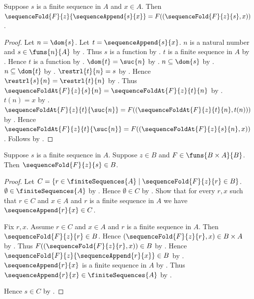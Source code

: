 \begin{theorem}\label{sequence_fold_append}
    Suppose $s$ is a finite sequence in $A$ and $x\in A$.
    Then
        $\sequenceFold{F}{z}{\sequenceAppend{s}{x}}
            =F((\sequenceFold{F}{z}{s},x))$.
\end{theorem}
\begin{proof}
    Let $n=\dom{s}$.
    Let $t=\sequenceAppend{s}{x}$.
    $n$ is a natural number and $s\in\funs{n}{A}$
        by .
    Thus $s$ is a function by .
    $t$ is a finite sequence in $A$
        by .
    Hence $t$ is a function by
        .
    $\dom{t}=\suc{n}$ by .
    $n\subseteq\dom{s}$ by .
    $n\subseteq\dom{t}$
        by .
    $\restrl{t}{n}=s$ by .
    Hence $\restrl{s}{n}=\restrl{t}{n}$
        by .
    Thus $\sequenceFoldAt{F}{z}{s}{n}
        =\sequenceFoldAt{F}{z}{t}{n}$
        by .
    $t(n)=x$ by .
    $\sequenceFoldAt{F}{z}{t}{\suc{n}}
        =F((\sequenceFoldAt{F}{z}{t}{n},t(n)))$
        by .
    Hence $\sequenceFoldAt{F}{z}{t}{\suc{n}}
        =F((\sequenceFoldAt{F}{z}{s}{n},x))$.
    Follows by .
\end{proof}

\begin{theorem}\label{sequence_fold_typed}
    Suppose $s$ is a finite sequence in $A$.
    Suppose $z\in B$ and $F\in\funs{B\times A}{B}$.
    Then $\sequenceFold{F}{z}{s}\in B$.
\end{theorem}
\begin{proof}
    Let $C=\{r\in\finiteSequences{A}\mid
        \sequenceFold{F}{z}{r}\in B\}$.
    $\emptyset\in\finiteSequences{A}$
        by .
    Hence $\emptyset\in C$
        by .
    Show that for every $r,x$ such that $r\in C$ and $x\in A$ and
        $r$ is a finite sequence in $A$ we have
        $\sequenceAppend{r}{x}\in C$.
    \begin{subproof}
        Fix $r,x$.
        Assume $r\in C$ and $x\in A$ and
            $r$ is a finite sequence in $A$.
        Then $\sequenceFold{F}{z}{r}\in B$.
        Hence $(\sequenceFold{F}{z}{r},x)\in B\times A$
            by .
        Thus $F((\sequenceFold{F}{z}{r},x))\in B$
            by .
        Hence $\sequenceFold{F}{z}{\sequenceAppend{r}{x}}\in B$
            by .
        $\sequenceAppend{r}{x}$ is a finite sequence in $A$
            by .
        Thus $\sequenceAppend{r}{x}\in\finiteSequences{A}$
            by .
    \end{subproof}
    Hence $s\in C$ by .
\end{proof}
